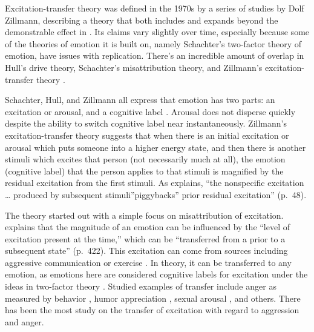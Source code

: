 \documentclass[
  stu]{apa7}
\begin{document}
Excitation-transfer theory was defined in the 1970s by a series of
studies by Dolf Zillmann, describing a theory that both includes and
expands beyond the demonstrable effect in
\textcite{zilEffectResidualExcitation}. Its claims vary slightly over
time, especially because some of the theories of emotion it is built on,
namely Schachter's two-factor theory of emotion, have issues with
replication. There's an incredible amount of overlap in Hull's drive
theory, Schachter's misattribution theory, and Zillmann's
excitation-transfer theory
\autocite{bryExcitationTransferTheoryThreeFactor}.

Schachter, Hull, and Zillmann all express that emotion has two parts: an
excitation or arousal, and a cognitive label
\autocite{bryExcitationTransferTheoryThreeFactor}. Arousal does not
disperse quickly despite the ability to switch cognitive label near
instantaneously. Zillmann's excitation-transfer theory suggests that
when there is an initial excitation or arousal which puts someone into a
higher energy state, and then there is another stimuli which excites
that person (not necessarily much at all), the emotion (cognitive label)
that the person applies to that stimuli is magnified by the residual
excitation from the first stimuli. As
\textcite{bryExcitationTransferTheoryThreeFactor} explains, ``the
nonspecific excitation \ldots{} produced by subsequent
stimuli''piggybacks'' prior residual excitation'' (p.~48).

The theory started out with a simple focus on misattribution of
excitation. \textcite{zilExcitationTransferCommunicationmediated}
explains that the magnitude of an emotion can be influenced by the
``level of excitation present at the time,'' which can be ``transferred
from a prior to a subsequent state'' (p.~422). This excitation can come
from sources including aggressive communication
\autocite{zilExcitationTransferCommunicationmediated} or exercise
\autocite{zilExcitationTransferPhysical}. In theory, it can be
transferred to any emotion, as emotions here are considered cognitive
labels for excitation under the ideas in two-factor theory \autocite[
421]{zilExcitationTransferCommunicationmediated}. Studied examples of
transfer include anger as measured by behavior
\autocite{zilExcitationTransferCommunicationmediated}, humor
appreciation \autocite{canEnhancementHumorAppreciation}, sexual arousal
\autocite{canEnhancementExperiencedSexual}, and others. There has been
the most study on the transfer of excitation with regard to aggression
and anger.
\end{document}
